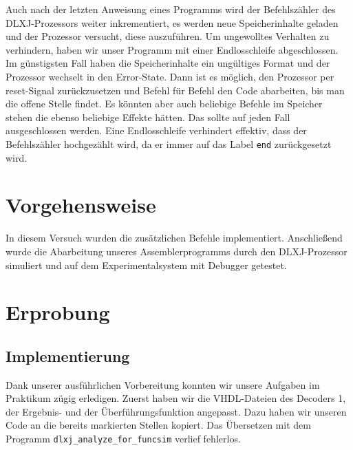 \documentclass[12pt,a4paper]{scrartcl}
\begin{document}
Auch nach der letzten Anweisung eines Programms wird der Befehlsz\"ahler des DLXJ-Prozessors weiter inkrementiert, es werden neue Speicherinhalte geladen und der Prozessor versucht, diese auszuf\"uhren.
Um ungewolltes Verhalten zu verhindern, haben wir unser Programm mit einer Endlosschleife abgeschlossen.
Im g\"unstigsten Fall haben die Speicherinhalte ein ung\"ultiges Format und der Prozessor wechselt in den Error-State.
Dann ist es m\"oglich, den Prozessor per reset-Signal zur\"uckzusetzen und Befehl f\"ur Befehl den Code abarbeiten, bis man die offene Stelle findet.
Es k\"onnten aber auch beliebige Befehle im Speicher stehen die ebenso beliebige Effekte h\"atten.
Das sollte auf jeden Fall ausgeschlossen werden.
Eine Endlosschleife verhindert effektiv, dass der Befehlsz\"ahler hochgez\"ahlt wird, da er immer auf das Label \texttt{end} zur\"uckgesetzt wird.

\section{Vorgehensweise}
In diesem Versuch wurden die zus\"atzlichen Befehle implementiert.
Anschlie\ss end wurde die Abarbeitung unseres Assemblerprogramms durch den DLXJ-Prozessor simuliert und auf dem Experimentalsystem mit Debugger getestet.

\section{Erprobung}
\subsection*{Implementierung}
Dank unserer ausf\"uhrlichen Vorbereitung konnten wir unsere Aufgaben im Praktikum z\"ugig erledigen.
Zuerst haben wir die VHDL-Dateien des Decoders 1, der Ergebnis- und der \"Uberf\"uhrungsfunktion angepasst.
Dazu haben wir unseren Code an die bereits markierten Stellen kopiert.
Das \"Ubersetzen mit dem Programm \texttt{dlxj\_analyze\_for\_funcsim} verlief fehlerlos.
\end{document}
